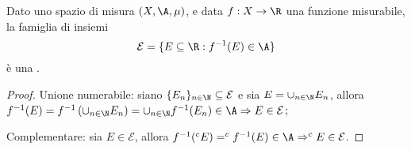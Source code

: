 \begin{proposition}
	\label{CounterImgMis}
	Dato uno spazio di misura $(X,\A,\mu)$, e data $f:X\rightarrow \R$ una funzione misurabile, la famiglia di insiemi
	\[
		\mathcal{E} = \{ E\subseteq \R : f^{-1}(E)\in \A \}
	\]
	è una \sigalg{}.
\end{proposition}
\begin{proof}
	Unione numerabile: siano $\{E_n\}_{n\in \N}\subseteq \mathcal{E}$ e sia $E = \cup_{n\in \N}E_n$,
	allora $f^{-1}(E)=f^{-1}\left(\cup_{n\in \N}E_n\right) = \cup_{n\in \N}f^{-1}(E_n)\in \A \Rightarrow E \in \mathcal{E}$;
	
	Complementare: sia $E\in \mathcal{E}$, allora $f^{-1}(^{c}E)= ^{c}f^{-1}(E)\in \A \Rightarrow ^{c}E \in \mathcal{E}$.
\end{proof}
